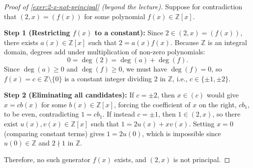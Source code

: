 \begin{content}

\begin{proof}[Proof of \cref{exer:2-x-not-principal} (beyond the lecture)]
Suppose for contradiction that $(2, x) = (f(x))$ for some polynomial $f(x) \in \mathbb{Z}[x]$.

\textbf{Step 1 (Restricting $f(x)$ to a constant):} Since $2 \in (2, x) = (f(x))$, there exists $a(x) \in \mathbb{Z}[x]$ such that $2 = a(x) f(x)$. Because $\mathbb{Z}$ is an integral domain, degrees add under multiplication of non-zero polynomials:
\[
0 = \deg(2) = \deg(a) + \deg(f).
\]
Since $\deg(a) \ge 0$ and $\deg(f) \ge 0$, we must have $\deg(f) = 0$, so $f(x) = c \in \mathbb{Z} \setminus \{0\}$ is a constant integer dividing $2$ in $\mathbb{Z}$, i.e., $c \in \{\pm 1, \pm 2\}$.

\textbf{Step 2 (Eliminating all candidates):} If $c = \pm 2$, then $x \in (c)$ would give $x = c b(x)$ for some $b(x) \in \mathbb{Z}[x]$, forcing the coefficient of $x$ on the right, $c b_1$, to be even, contradicting $1 = c b_1$. If instead $c = \pm 1$, then $1 \in (2, x)$, so there exist $u(x), v(x) \in \mathbb{Z}[x]$ such that $1 = 2 u(x) + x v(x)$. Setting $x = 0$ (comparing constant terms) gives $1 = 2 u(0)$, which is impossible since $u(0) \in \mathbb{Z}$ and $2 \nmid 1$ in $\mathbb{Z}$.

Therefore, no such generator $f(x)$ exists, and $(2, x)$ is not principal.
\end{proof}



\end{content}
